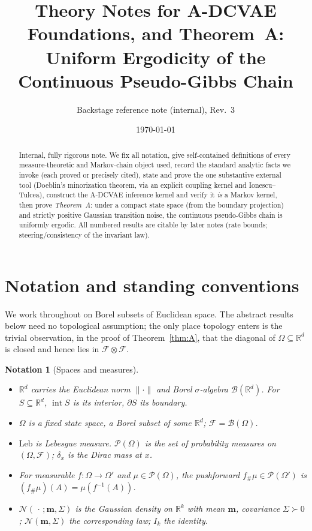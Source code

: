 \documentclass[11pt]{article}
\title{\textbf{Theory Notes for A-DCVAE}\\[2pt]
\large Foundations, and Theorem~A: Uniform Ergodicity of the Continuous Pseudo-Gibbs Chain}
\author{Backstage reference note (internal), Rev.\ 3}
\date{\today}
\theoremstyle{definitionbreak}
\newtheorem{notation}{Notation}[section]
\theoremstyle{plainbreak}
\theoremstyle{remarkbreak}
\newcommand{\R}{\mathbb{R}}
\newcommand{\cF}{\mathcal{F}}
\newcommand{\cB}{\mathcal{B}}
\newcommand{\cP}{\mathcal{P}}
\newcommand{\Om}{\Omega}
\newcommand{\Leb}{\mathrm{Leb}}
\newcommand{\Normal}{\mathcal{N}}
\newcommand{\push}{{}_{\#}}
\DeclareMathOperator{\intr}{int}
\newcommand{\norm}[1]{\lVert #1 \rVert}
\begin{document}
\maketitle

\begin{abstract}
Internal, fully rigorous note. We fix all notation, give self-contained definitions of every
measure-theoretic and Markov-chain object used, record the standard analytic facts we invoke (each
proved or precisely cited), state and prove the one substantive external tool (Doeblin's
minorization theorem, via an explicit coupling kernel and Ionescu--Tulcea), construct the A-DCVAE
inference kernel and verify it \emph{is} a Markov kernel, then prove \emph{Theorem~A}: under a
compact state space (from the boundary projection) and strictly positive Gaussian transition noise,
the continuous pseudo-Gibbs chain is uniformly ergodic. All numbered results are citable by later
notes (rate bounds; steering/consistency of the invariant law).
\end{abstract}

\tableofcontents

\section{Notation and standing conventions}
\label{sec:notation}

We work throughout on Borel subsets of Euclidean space. The abstract results below need no
topological assumption; the only place topology enters is the trivial observation, in the proof of
Theorem~\ref{thm:A}, that the diagonal of $\Om\subseteq\R^d$ is closed and hence lies in
$\cF\otimes\cF$.

\begin{notation}[Spaces and measures]\leavevmode
\begin{itemize}
  \item $\R^d$ carries the Euclidean norm $\norm{\cdot}$ and Borel $\sigma$-algebra $\cB(\R^d)$.
        For $S\subseteq\R^d$, $\intr S$ is its interior, $\partial S$ its boundary.
  \item $\Om$ is a fixed \emph{state space}, a Borel subset of some $\R^d$; $\cF=\cB(\Om)$.
  \item $\Leb$ is Lebesgue measure. $\cP(\Om)$ is the set of probability measures on $(\Om,\cF)$;
        $\delta_x$ is the Dirac mass at $x$.
  \item For measurable $f:\Om\to\Om'$ and $\mu\in\cP(\Om)$, the pushforward $f\push\mu\in\cP(\Om')$
        is $(f\push\mu)(A)=\mu(f^{-1}(A))$.
  \item $\Normal(\,\cdot\,;\bm m,\Sigma)$ is the Gaussian density on $\R^k$ with mean $\bm m$,
        covariance $\Sigma\succ0$; $\Normal(\bm m,\Sigma)$ the corresponding law; $I_k$ the identity.
\end{itemize}
\end{notation}
\end{document}
